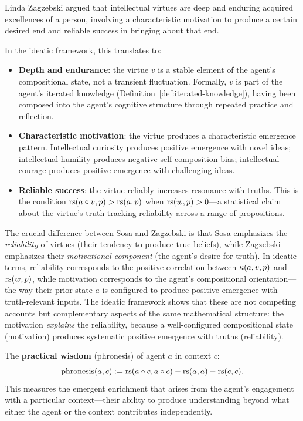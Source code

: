 \begin{remark}
Linda Zagzebski argued that intellectual virtues are deep and enduring acquired
excellences of a person, involving a characteristic motivation to produce a certain
desired end and reliable success in bringing about that end.

In the ideatic framework, this translates to:
\begin{itemize}
\item \textbf{Depth and endurance}: the virtue $v$ is a stable element of the
  agent's compositional state, not a transient fluctuation. Formally, $v$ is
  part of the agent's iterated knowledge (Definition~\ref{def:iterated-knowledge}),
  having been composed into the agent's cognitive structure through repeated
  practice and reflection.
\item \textbf{Characteristic motivation}: the virtue produces a characteristic
  emergence pattern. Intellectual curiosity produces positive emergence with
  novel ideas; intellectual humility produces negative self-composition bias;
  intellectual courage produces positive emergence with challenging ideas.
\item \textbf{Reliable success}: the virtue reliably increases resonance with
  truths. This is the condition $\mathrm{rs}(a \circ v, p) > \mathrm{rs}(a, p)$ when
  $\mathrm{rs}(w, p) > 0$---a statistical claim about the virtue's truth-tracking
  reliability across a range of propositions.
\end{itemize}

The crucial difference between Sosa and Zagzebski is that Sosa emphasizes the
\emph{reliability} of virtues (their tendency to produce true beliefs), while
Zagzebski emphasizes their \emph{motivational component} (the agent's desire for
truth). In ideatic terms, reliability corresponds to the positive correlation
between $\kappa(a, v, p)$ and $\mathrm{rs}(w, p)$, while motivation corresponds to the
agent's compositional orientation---the way their prior state $a$ is configured to
produce positive emergence with truth-relevant inputs. The ideatic framework shows
that these are not competing accounts but complementary aspects of the same
mathematical structure: the motivation \emph{explains} the reliability, because
a well-configured compositional state (motivation) produces systematic positive
emergence with truths (reliability).
\end{remark}

\begin{definition}
\label{def:phronesis}
The \textbf{practical wisdom} (phronesis) of agent $a$ in context $c$:
\[
  \mathrm{phronesis}(a, c) := \mathrm{rs}(a \circ c, a \circ c) - \mathrm{rs}(a, a) - \mathrm{rs}(c, c).
\]
This measures the emergent enrichment that arises from the agent's engagement
with a particular context---their ability to produce understanding beyond what
either the agent or the context contributes independently.
\end{definition}

